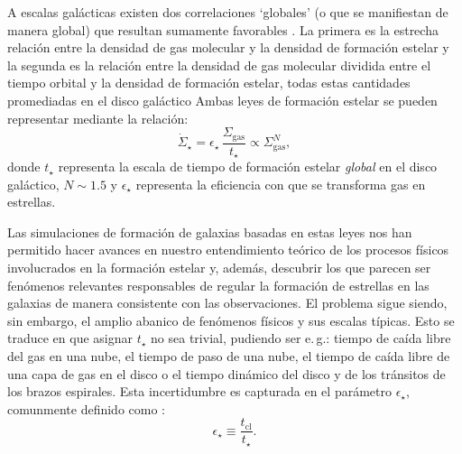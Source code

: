 \documentclass{article}
\begin{document}
\begin{description}
A escalas galácticas existen dos correlaciones `globales' (o que se manifiestan de manera global)
que resultan sumamente favorables \citep[e.\,g.][]{Schmidt1959, Kennicutt1998, Kennicutt2012}. La
primera es la estrecha relación entre la densidad de gas molecular y la densidad de formación
estelar y la segunda es la relación entre la densidad de gas molecular dividida entre el tiempo
orbital y la densidad de formación estelar, todas estas cantidades promediadas en el disco galáctico
Ambas leyes de formación estelar se pueden representar mediante la relación:
$$
\dot{\Sigma}_\star = \epsilon_\star\,\frac{\Sigma_\text{gas}}{t_\star}\propto\Sigma_\text{gas}^N,
$$
%
donde $t_\star$ representa la escala de tiempo de formación estelar \emph{global} en el disco
galáctico, $N\sim1.5$ y $\epsilon_\star$ representa la eficiencia con que se transforma gas en
estrellas.

Las simulaciones de formación de galaxias basadas en estas leyes nos han permitido hacer avances en
nuestro entendimiento teórico de los procesos físicos involucrados en la formación estelar
\citep{Krumholz2014} y, además, descubrir los que parecen ser fenómenos relevantes responsables de
regular la formación de estrellas en las galaxias de manera consistente con las observaciones. El
problema sigue siendo, sin embargo, el amplio abanico de fenómenos físicos y sus escalas típicas.
Esto se traduce en que asignar $t_\star$ no sea trivial, pudiendo ser e.\,g.: tiempo de caída libre
del gas en una nube, el tiempo de paso de una nube, el tiempo de caída libre de una capa de gas en
el disco o el tiempo dinámico del disco y de los tránsitos de los brazos espirales. Esta
incertidumbre es capturada en el parámetro $\epsilon_\star$, comunmente definido como
\citep{Krumholz2014}:
$$
\epsilon_\star \equiv \frac{t_\text{cl}}{t_\star}.
$$


\end{description}
\end{document}
